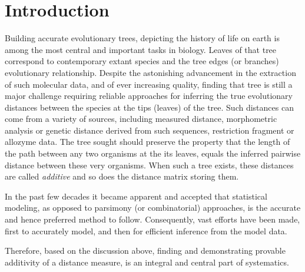 \documentclass[runningheads, 11pt]{llncs}
\begin{document}
\section{Introduction}
Building accurate evolutionary trees, depicting the history of life on earth
is among the most central and important tasks in biology. Leaves of that tree
correspond to contemporary extant species and the tree edges (or branches)
evolutionary relationship. Despite the astonishing advancement in the extraction
of such molecular data, and of ever increasing quality, finding that tree is
still a major challenge requiring reliable approaches for inferring the true
evolutionary distances between the species at the tips (leaves) of the tree.
Such distances can come from a variety of sources, including measured distance,
morphometric analysis or genetic distance derived from such sequences,
restriction fragment or allozyme data. The tree sought should preserve the
property that the length of the path between any two organisms at the its
leaves, equals the inferred pairwise distance between these very organisms. When
such a tree exists, these distances are called {\em additive} and so does the
distance matrix storing them. 

In the past few decades it became apparent and accepted that statistical
modeling, as opposed to parsimony (or combinatorial) approaches, is the accurate
and hence preferred method to follow. Consequently, vast efforts have been made,
first to accurately model, and then for efficient inference from the model
data.

Therefore, based on the discussion above, finding and demonstrating provable
additivity of a distance measure, is an integral and central part of
systematics.
\end{document}
